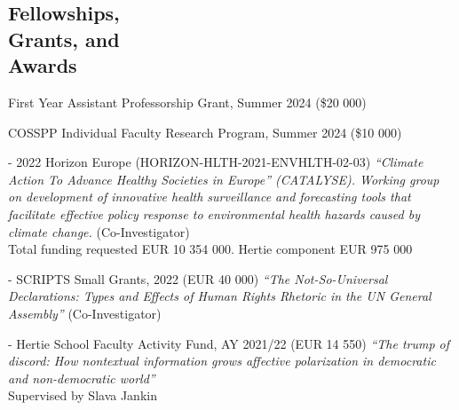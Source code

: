 \documentclass[margin,line,10.95pt]{res}
\begin{document}
\begin{resume}





\section{\sc Fellowships,   \\ Grants,  and  \\Awards}

First Year Assistant Professorship Grant, Summer 2024 (\$20 000)

\vspace*{-3.5mm}

COSSPP Individual Faculty Research Program, Summer 2024 (\$10 000)


- 2022 Horizon Europe (HORIZON-HLTH-2021-ENVHLTH-02-03) \textit{“Climate Action To Advance Healthy Societies in Europe” (CATALYSE). Working group on development of innovative health surveillance and forecasting tools that facilitate effective policy response to environmental health hazards caused by climate change.} (Co-Investigator)
\\
Total funding requested EUR 10 354 000. Hertie component EUR 975 000

\vspace*{-3.5mm}

- SCRIPTS Small Grants, 2022 (EUR 40 000) \textit{“The Not-So-Universal Declarations: Types and Effects of Human Rights Rhetoric in the UN General Assembly”} (Co-Investigator)

\vspace*{-3.5mm}

- Hertie School Faculty Activity Fund, AY 2021/22 (EUR 14 550) \textit{“The trump of discord: How nontextual information grows affective polarization in democratic and non-democratic world”} 
\\
Supervised by Slava Jankin
\\


\end{resume}
\end{document}
